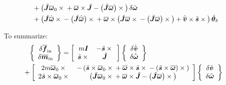 \documentclass[10pt,dvips,fleqn,subeqn]{report}
\newcommand{\T}[1]{\bm{#1}}
\newcommand{\TT}[1]{\bm{#1}}
\begin{document}
\begin{subequations}
\begin{align}
	\nonumber \\ &\hphantom{=}
	+ \plbr{
		\tilde{\TT{J}} \overline{\T{\omega}}_0 \times{}
		+ \overline{\T{\omega}} \times \tilde{\TT{J}}
		- \plbr{\tilde{\TT{J}} \overline{\T{\omega}}} \times{}
	} \delta\tilde{\T{\omega}}
	\nonumber \\ &\hphantom{=}
	+ \plbr{
		\tilde{\TT{J}} \dot{\overline{\T{\omega}}} \times{}
		- \plbr{\tilde{\TT{J}} \dot{\overline{\T{\omega}}}} \times{}
		+ \overline{\T{\omega}} \times \plbr{
			\tilde{\T{J}} \overline{\T{\omega}} \times{}
			- \plbr{\tilde{\TT{J}} \overline{\T{\omega}}} \times{}
		}
		+ \dot{\overline{\T{v}}} \times \tilde{\T{s}} \times{}
	} \tilde{\T{\theta}}_{\delta}
\end{align}
\end{subequations}

To summarize:
\begin{align}
	\cubr{\cvvect{
		\delta\overline{\T{f}}_{\text{in}} \\
		\delta\overline{\T{m}}_{\text{in}} \\
	}} &= \sqbr{\matr{cc}{
		m \TT{I} & -\tilde{\T{s}} \times{} \\
		\tilde{\T{s}} \times{} & \tilde{\TT{J}}
	}} \cubr{\cvvect{
		\delta\dot{\tilde{\T{v}}} \\
		\delta\dot{\tilde{\T{\omega}}}
	}}
	\nonumber \\ & \hspace{-20mm}
	+ \sqbr{\matr{cc}{
		2 m \overline{\T{\omega}}_0 \times{}
		& - \plbr{
			\tilde{\T{s}} \times \overline{\T{\omega}}_0 \times{}
			+ \overline{\T{\omega}} \times \tilde{\T{s}} \times{}
			- \plbr{\tilde{\T{s}} \times \overline{\T{\omega}}} \times{}
		} \\
		2 \tilde{\T{s}} \times \overline{\T{\omega}}_0 \times{}
		& \plbr{
			\tilde{\TT{J}} \overline{\T{\omega}}_0 \times{}
			+ \overline{\T{\omega}} \times \tilde{\TT{J}}
			- \plbr{\tilde{\TT{J}} \overline{\T{\omega}}} \times{}
		}
	}} \cubr{\cvvect{
		\delta\tilde{\T{v}} \\
		\delta\tilde{\T{\omega}}
	}}

\end{align}
\end{document}
